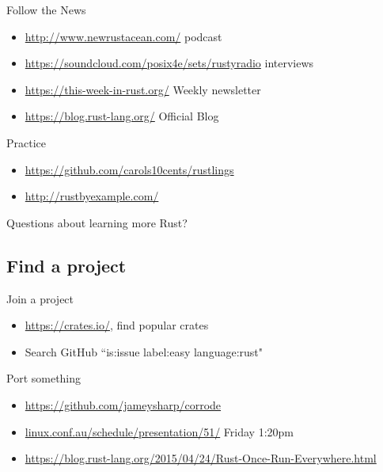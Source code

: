 \documentclass[100pt]{beamer}
\begin{document}
\begin{frame}
    Follow the News
    \begin{itemize}
        \item \url{http://www.newrustacean.com/} podcast
        \item \url{https://soundcloud.com/posix4e/sets/rustyradio} interviews
        \item \url{https://this-week-in-rust.org/} Weekly newsletter
        \item \url{https://blog.rust-lang.org/} Official Blog
    \end{itemize}
\end{frame}

\begin{frame}
    Practice
    \begin{itemize}
        \item \url{https://github.com/carols10cents/rustlings}
        \item \url{http://rustbyexample.com/}
    \end{itemize}
\end{frame}

\begin{frame}
    Questions about learning more Rust?
\end{frame}


\subsection{Find a project}

\begin{frame}
    Join a project
    \begin{itemize}
        \item \url{https://crates.io/}, find popular crates
        \item Search GitHub ``is:issue label:easy language:rust"
    \end{itemize}
\end{frame}

\begin{frame}
    Port something
    \begin{itemize}
        \item \url{https://github.com/jameysharp/corrode}
        \item \url{linux.conf.au/schedule/presentation/51/} Friday 1:20pm
        \item \url{https://blog.rust-lang.org/2015/04/24/Rust-Once-Run-Everywhere.html}
    \end{itemize}
\end{frame}
\end{document}
